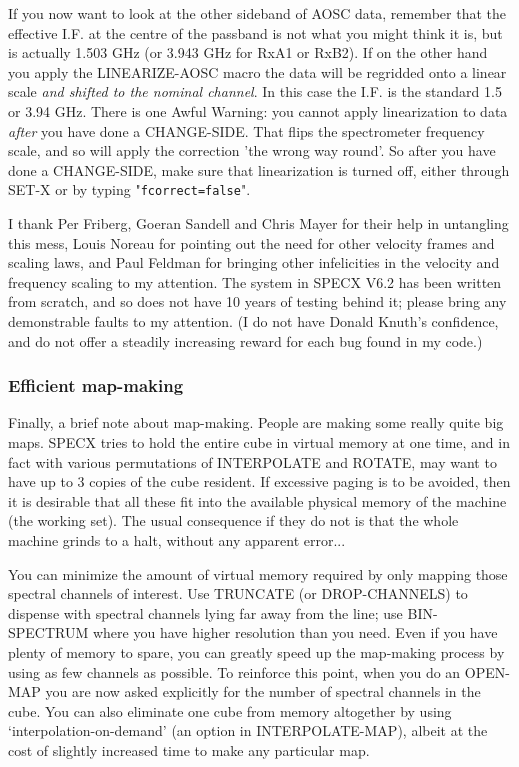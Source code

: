 \documentclass[twoside,11pt]{article}
\renewcommand{\_}{\texttt{\symbol{95}}}
\begin{document}
If you now want to look at the other sideband of AOSC data, remember that the
effective I.F. at the centre of the passband is not what you might think it
is, but is actually 1.503 GHz (or 3.943 GHz for RxA1 or RxB2). If on the other
hand you apply the LINEARIZE-AOSC macro the data will be regridded onto a
linear scale \emph{and shifted to the nominal channel}. In this case the
I.F. is the standard 1.5 or 3.94 GHz. There is one Awful Warning: you cannot
apply linearization to data \emph{after} you have done a CHANGE-SIDE. That
flips the spectrometer frequency scale, and so will apply the correction 'the
wrong way round'. So after you have done a CHANGE-SIDE, make sure that
linearization is turned off, either through SET-X or by typing
"\texttt{fcorrect=false}".

I thank Per Friberg, Goeran Sandell and Chris Mayer for their help in
untangling this mess, Louis Noreau for pointing out the need for other
velocity frames and scaling laws, and Paul Feldman for bringing other
infelicities in the velocity and frequency scaling to my attention. The system
in SPECX V6.2 has been written from scratch, and so does not have 10 years of
testing behind it; please bring any demonstrable faults to my attention. (I do
not have Donald Knuth's confidence, and do not offer a steadily increasing
reward for each bug found in my code.)

\subsubsection{Efficient map-making}

Finally, a brief note about map-making. People are making some really quite
big maps. SPECX tries to hold the entire cube in virtual memory at one time,
and in fact with various permutations of INTERPOLATE and ROTATE, may want to
have up to 3 copies of the cube resident. If excessive paging is to be
avoided, then it is desirable that all these fit into the available physical
memory of the machine (the working set). The usual consequence if they do not
is that the whole machine grinds to a halt, without any apparent error...

You can minimize the amount of virtual memory required by only mapping those
spectral channels of interest. Use TRUNCATE (or DROP-CHANNELS) to dispense
with spectral channels lying far away from the line; use BIN-SPECTRUM where
you have higher resolution than you need. Even if you have plenty of memory to
spare, you can greatly speed up the map-making process by using as few
channels as possible. To reinforce this point, when you do an OPEN-MAP you are
now asked explicitly for the number of spectral channels in the cube. You can
also eliminate one cube from memory altogether by using
`interpolation-on-demand' (an option in INTERPOLATE-MAP), albeit at the cost
of slightly increased time to make any particular map.
\end{document}
